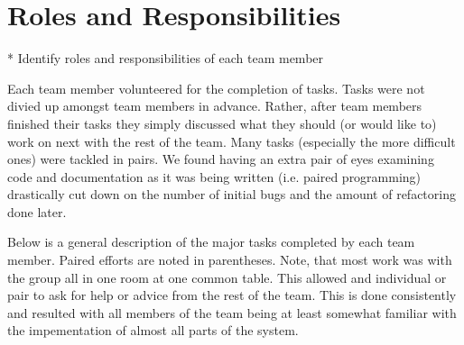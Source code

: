 \section{Roles and Responsibilities}
* Identify roles and responsibilities of each team member

Each team member volunteered for the completion of tasks.  Tasks were not divied up amongst team members in advance.  Rather, after team members finished their tasks they simply discussed what they should (or would like to) work on next with the rest of the team.  Many tasks (especially the more difficult ones) were tackled in pairs.  We found having an extra pair of eyes examining code and documentation as it was being written (i.e. paired programming) drastically cut down on the number of initial bugs and the amount of refactoring done later.

Below is a general description of the major tasks completed by each team member.  Paired efforts are noted in parentheses.  Note, that most work was with the group all in one room at one common table.  This allowed and individual or pair to ask for help or advice from the rest of the team.  This is done consistently and resulted with all members of the team being at least somewhat familiar with the impementation of almost all parts of the system.

